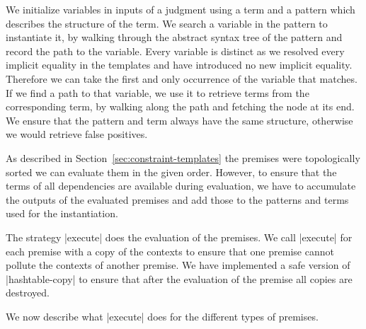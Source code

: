 We initialize variables in inputs of a judgment using a term and a
pattern which describes the structure of the term. We search a
variable in the pattern to instantiate it, by walking through the
abstract syntax tree of the pattern and record the path to the
variable. Every variable is distinct as we resolved every implicit
equality in the templates and have introduced no new implicit
equality. Therefore we can take the first and only occurrence of the
variable that matches. If we find a path to that variable, we use it
to retrieve terms from the corresponding term, by walking along the
path and fetching the node at its end. We ensure that the pattern and
term always have the same structure, otherwise we would retrieve false
positives.

As described in Section~\ref{sec:constraint-templates} the premises
were topologically sorted we can evaluate them in the given
order. However, to ensure that the terms of all dependencies are
available during evaluation, we have to accumulate the outputs of the
evaluated premises and add those to the patterns and terms used for
the instantiation.

The strategy \code|execute| does the evaluation of the premises. We
call \code|execute| for each premise with a copy of the contexts to
ensure that one premise cannot pollute the contexts of another
premise. We have implemented a safe version of \code|hashtable-copy|
to ensure that after the evaluation of the premise all copies are
destroyed.

We now describe what \code|execute| does for the different types of
premises.

